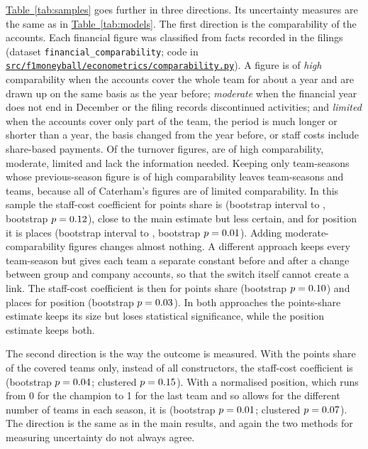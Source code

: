 \documentclass[11pt,a4paper]{article}
\newcommand{\repo}{https://github.com/NahianIbnat-2000/F1-moneyball}
\newcommand{\code}[1]{\href{\repo/blob/main/#1}{\nolinkurl{#1}}}
\begin{document}
\hyperref[tab:samples]{Table~\ref*{tab:samples}} goes further in three directions. Its uncertainty measures are the same
as in \hyperref[tab:models]{Table~\ref*{tab:models}}. The first direction is the comparability of the accounts. Each
financial figure was classified from facts recorded in the filings (dataset \texttt{financial\_comparability};
code in \code{src/f1moneyball/econometrics/comparability.py}).
A figure is of \textit{high} comparability when the accounts cover the whole team for about a year and are drawn up on the
same basis as the year before; \textit{moderate} when the financial year does not end in December or the filing records
discontinued activities; and \textit{limited} when the accounts cover only part of the team, the period is much longer or
shorter than a year, the basis changed from the year before, or staff costs include share-based payments. Of the
\CompTotal{} turnover figures, \CompHigh{} are of high comparability, \CompModerate{} moderate, \CompLimited{} limited and
\CompInsufficient{} lack the information needed. Keeping only team-seasons whose previous-season figure is of high
comparability leaves \HighPtsNStaff{} team-seasons and \HighPtsGStaff{} teams, because all of Caterham's figures are of
limited comparability. In this sample the staff-cost coefficient for points share is \HighPtsStaff{} (bootstrap interval
\HighPtsCiLowStaff{} to \HighPtsCiHighStaff, bootstrap $p = 0.12$), close to the main estimate but less
certain, and for position it is \HighPosStaff{} places (bootstrap interval \HighPosCiLowStaff{} to \HighPosCiHighStaff,
bootstrap $p = 0.01$). Adding moderate-comparability figures changes almost nothing. A different approach
keeps every team-season but gives each team a separate constant before and after a change between group and company
accounts, so that the switch itself cannot create a link. The staff-cost coefficient is then \SegPtsStaff{} for points
share (bootstrap $p = 0.10$) and \SegPosStaff{} places for position (bootstrap $p = 0.03$). In
both approaches the points-share estimate keeps its size but loses statistical significance, while the position estimate
keeps both.

The second direction is the way the outcome is measured. With the points share of the covered teams only, instead of all
constructors, the staff-cost coefficient is \CoveredStaff{} (bootstrap $p = 0.04$; clustered
$p = 0.15$). With a normalised position, which runs from 0 for the champion to 1 for the last team and so
allows for the different number of teams in each season, it is \NormPosStaff{} (bootstrap $p = 0.01$;
clustered $p = 0.07$). The direction is the same as in the main results, and again the two methods for measuring
uncertainty do not always agree.
\end{document}
